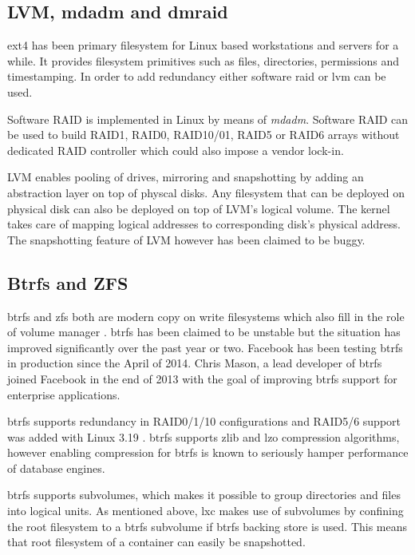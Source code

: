 \documentclass[a4paper,11pt]{kth-mag}
\begin{document}
\subsection{LVM, mdadm and dmraid}

\acrshort{ext4} has been primary filesystem for Linux based workstations and
servers for a while. It provides filesystem primitives such as files,
directories, permissions and timestamping.
In order to add redundancy
either software \acrfull{raid} or \acrfull{lvm} can be used.

Software RAID is implemented in Linux by means of \emph{mdadm}.
Software RAID can be used to build RAID1, RAID0, RAID10/01, RAID5
or RAID6 arrays without dedicated RAID controller which could also
impose a vendor lock-in.

LVM enables pooling of drives, mirroring and snapshotting by adding
an abstraction layer on top of physcal disks. Any filesystem that
can be deployed on physical disk can also be deployed on top of
LVM's logical volume. The kernel takes care of mapping logical
addresses to corresponding disk's physical address.
The snapshotting feature of LVM however has been claimed to be buggy.
\cite{fedora-and-lvm}


\subsection{Btrfs and ZFS}

\acrshort{btrfs} and \acrfull{zfs} both are modern copy on write filesystems
which also fill in the role of volume manager
\cite{btrfs-the-linux-b-tree-filesystem}
\cite{chris-mason-the-btrfs-filesystem}.
\acrshort{btrfs} has been claimed to be unstable but the situation has
improved significantly over the past year or two.
Facebook has been testing \acrshort{btrfs} in production since the April of 2014.
\cite{btrfs-production-users}
Chris Mason, a lead developer of \acrshort{btrfs} joined Facebook
in the end of 2013 with the goal of improving \acrshort{btrfs} support
for enterprise applications.
\cite{leaving-fusionio}

\acrshort{btrfs} supports redundancy in RAID0/1/10 configurations and
RAID5/6 support was added with Linux 3.19 \cite{btrfs-for-3.19}.
\acrshort{btrfs} supports zlib and lzo compression algorithms,
however enabling compression for \acrshort{btrfs} is known to
seriously hamper performance of database engines.

\acrshort{btrfs} supports subvolumes, which makes it possible to group
directories and files into logical units.
As mentioned above, \acrshort{lxc} makes use of subvolumes
by confining the root filesystem to a \acrshort{btrfs} subvolume
if \acrshort{btrfs} backing store is used.
This means that root filesystem of a container
can easily be snapshotted.
\end{document}

